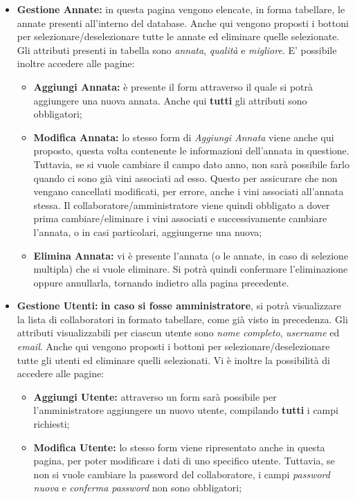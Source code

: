 \begin{itemize}
	\item \textbf{Gestione Annate:} in questa pagina vengono elencate, in forma tabellare, le annate presenti all'interno del database. Anche qui vengono proposti i bottoni per selezionare/deselezionare tutte le annate ed eliminare quelle selezionate. Gli attributi presenti in tabella sono \textit{annata}, \textit{qualità} e \textit{migliore}. E' possibile inoltre accedere alle pagine:
		\begin{itemize}
			\item \textbf{Aggiungi Annata:} è presente il form attraverso il quale si potrà aggiungere una nuova annata. Anche qui \textbf{tutti} gli attributi sono obbligatori;
			\item \textbf{Modifica Annata:} lo stesso form di \textit{Aggiungi Annata} viene anche qui proposto, questa volta contenente le informazioni dell'annata in questione. Tuttavia, se si vuole cambiare il campo dato anno, non sarà possibile farlo quando ci sono già vini associati ad esso. Questo per assicurare che non vengano cancellati modificati, per errore, anche i vini associati all'annata stessa. Il collaboratore/amministratore viene quindi obbligato a dover prima cambiare/eliminare i vini associati e successivamente cambiare l'annata, o in casi particolari, aggiungerne una nuova;
			\item \textbf{Elimina Annata:} vi è presente l'annata (o le annate, in caso di selezione multipla) che si vuole eliminare. Si potrà quindi confermare l'eliminazione oppure annullarla, tornando indietro alla pagina precedente.
		\end{itemize}
	\item \textbf{Gestione Utenti:} \textbf{in caso si fosse amministratore}, si potrà visualizzare la lista di collaboratori in formato tabellare, come già visto in precedenza. Gli attributi visualizzabili per ciascun utente sono \textit{nome completo}, \textit{username} ed \textit{email}. Anche qui vengono proposti i bottoni per selezionare/deselezionare tutte gli utenti ed eliminare quelli selezionati. Vi è inoltre la possibilità di accedere alle pagine:
		\begin{itemize}
			\item \textbf{Aggiungi Utente:} attraverso un form sarà possibile per l'amministratore aggiungere un nuovo utente, compilando \textbf{tutti} i campi richiesti;
			\item \textbf{Modifica Utente:} lo stesso form viene ripresentato anche in questa pagina, per poter modificare i dati di uno specifico utente. Tuttavia, se non si vuole cambiare la password del collaboratore, i campi \textit{password nuova} e \textit{conferma password} non sono obbligatori;

\end{itemize}
\end{itemize}
